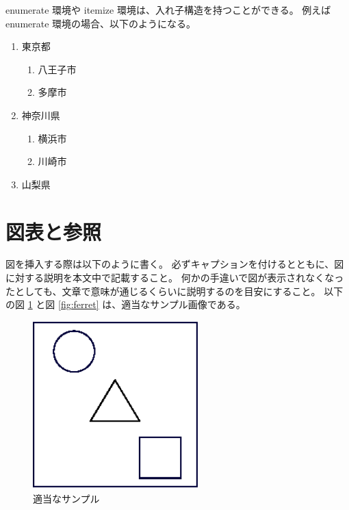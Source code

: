 enumerate 環境や itemize 環境は、入れ子構造を持つことができる。
例えば enumerate 環境の場合、以下のようになる。
\begin{enumerate}
 \item 東京都
 \begin{enumerate}
  \item 八王子市
  \item 多摩市
 \end{enumerate}
 \item 神奈川県
 \begin{enumerate}
  \item 横浜市
  \item 川崎市
 \end{enumerate}
 \item 山梨県
\end{enumerate}

\section{図表と参照}
\label{sec:fig_tbl}

図を挿入する際は以下のように書く。
必ずキャプションを付けるとともに、図に対する説明を本文中で記載すること。
何かの手違いで図が表示されなくなったとしても、文章で意味が通じるくらいに説明するのを目安にすること。
以下の図 \ref{fig:sample} と図 \ref{fig:ferret} は、適当なサンプル画像である。

\begin{figure}[H]
  \centering
  \includegraphics[width=6.4cm]{./fig/fig-sample.eps}
  \caption{適当なサンプル}
  \label{fig:sample}
\end{figure}

